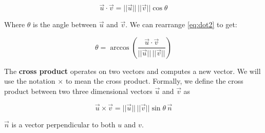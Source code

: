 \documentclass[a4paper]{article}
\begin{document}
\begin{equation} \label{eq:dot2}
\vec u \cdot \vec v = ||\vec u|| \, ||\vec v|| \cos\theta
\end{equation}

Where $\theta$ is the angle between $\vec u$ and $\vec v$. We can rearrange \ref{eq:dot2} to get:

\begin{equation} \label{eq:angle}
\theta = \arccos \left(\frac{\vec u \cdot \vec v}{||\vec u|| \, ||\vec v||}\right)
\end{equation}

The \textbf{cross product} operates on two vectors and computes a new vector. We will use the notation $\times$ to mean the cross product. Formally, we define the cross product between two three dimensional vectors $\vec u$ and $\vec v$ as

\[\vec u \times \vec v = ||\vec u|| \, ||\vec v|| \sin \theta \, \vec n\]

$\vec n$ is a vector perpendicular to both $u$ and $v$.





\end{document}
